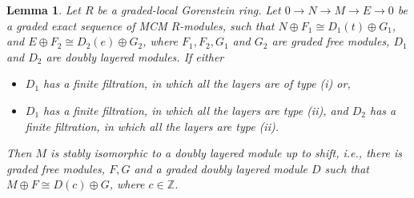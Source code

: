 \documentclass[11pt,letterpaper]{amsart}
\newcommand{\x}{\xrightarrow{}}
\theoremstyle{plain}
\newtheorem{lem}[thm]{Lemma}
\theoremstyle{definition}
\theoremstyle{remark}
\begin{document}
\begin{lem}\label{shortexactDL} Let $R$ be a graded-local Gorenstein ring.
Let $0\x N\x M\x E\x 0$ be a graded exact sequence of MCM $R$-modules, such that $N\oplus F_1\cong D_1(t)\oplus G_1$, and $E\oplus F_2\cong D_2(e)\oplus G_2$, where $F_1,F_2,G_1$ and $G_2$ are graded free modules, $D_1$ and $D_2$ are doubly layered modules. If either 
\begin{itemize}
    \item[$(a)$] $D_1$ has a finite filtration, in which all the layers are of type (i) or,
    \item[$(b)$] $D_1$ has a finite filtration, in which all the layers are type (ii), and $D_2$ has a finite filtration, in which all the layers are type (ii).
\end{itemize}

Then $M$ is stably isomorphic to a doubly layered module up to shift, i.e., there is graded free modules, $F,G$ and a graded doubly layered module $D$ such that $M\oplus F\cong D(c)\oplus G$, where $c\in\mathbb Z$.
\end{lem}
\end{document}
